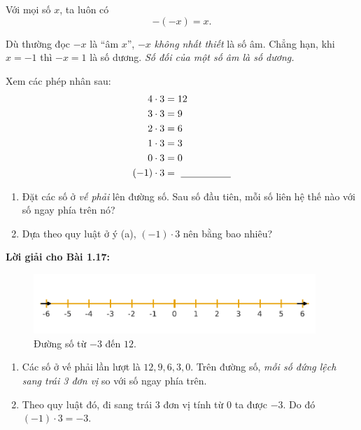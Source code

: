
\begin{tcolorbox}[colback=yellow!10, colframe=orange!80!black,
title={Quan trọng: Số đối của số đối}]
Với mọi số \(x\), ta luôn có
\[
-(-x)=x.
\]
\end{tcolorbox}

\begin{tcolorbox}[colback=red!3,colframe=red!70!black,title={Cẩn thận!}]
Dù thường đọc \(-x\) là “âm \(x\)”, \(-x\) \emph{không nhất thiết} là số âm.
Chẳng hạn, khi \(x=-1\) thì \(-x=1\) là số dương.  
\emph{Số đối của một số âm là số dương.}
\end{tcolorbox}

\begin{problem}[1.17]
Xem các phép nhân sau:
\[
\begin{aligned}
4\cdot3 &= 12\\
3\cdot3 &= 9\\
2\cdot3 &= 6\\
1\cdot3 &= 3\\
0\cdot3 &= 0\\
(-1)\cdot3 &=\ \underline{\hspace{1.8cm}}
\end{aligned}
\]
\begin{enumerate}[label=(\alph*)]
  \item Đặt các số ở \emph{vế phải} lên đường số. Sau số đầu tiên, mỗi
        số liên hệ thế nào với số ngay phía trên nó?
  \item Dựa theo quy luật ở ý (a), \((-1)\cdot3\) nên bằng bao nhiêu?
\end{enumerate}
\end{problem}

\noindent\textbf{Lời giải cho Bài 1.17:}

\begin{figure}[ht!]
  \centering
  \includegraphics[width=0.95\textwidth]{img/fig-numberline.pdf}
  \caption*{\small Đường số từ \(-3\) đến \(12\).}
\end{figure}

\begin{enumerate}[label=(\alph*)]
  \item Các số ở vế phải lần lượt là \(12,9,6,3,0\).
        Trên đường số, \emph{mỗi số đứng lệch sang trái 3 đơn vị}
        so với số ngay phía trên.
  \item Theo quy luật đó, đi sang trái \(3\) đơn vị tính từ \(0\) ta được \(-3\).
        Do đó \(\boxed{(-1)\cdot3=-3}\).
\end{enumerate}

